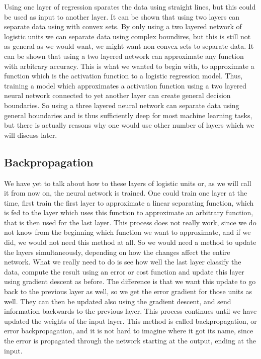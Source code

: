 Using one layer of regression sparates the data using straight lines, but this could be used as input to another layer. It can be shown that using two layers can separate data using with convex sets. By only using a two layered network of logistic units we can separate data using complex boundires, but this is still not as general as we would want, we might want non convex sets to separate data. It can be shown \cite{bishop_neural} that using a two layered network can approximate any function with arbitrary accuracy. This is what we wanted to begin with, to approximate a function which is the activation function to a logistic regression model. Thus, training a model which approximates a activation function using a two layered neural network connected to yet another layer can create general decision boundaries. So using a three layered neural network can separate data using general boundaries and is thus sufficiently deep for most machine learning tasks, but there is actually reasons why one would use other number of layers which we will discuss later.

\subsection{Backpropagation}

We have yet to talk about how to these layers of logistic units or, as we will call it from now on, the neural network is trained. One could train one layer at the time, first train the first layer to approximate a linear separating function, which is fed to the layer which uses this function to approximate an arbitrary function, that is then used for the last layer. This process does not really work, since we do not know from the beginning which function we want to approximate, and if we did, we would not need this method at all. So we would need a method to update the layers simultaneously, depending on how the changes affect the entire network. What we really need to do is see how well the last layer classify the data, compute the result using an error or cost function and update this layer using gradient descent as before. The difference is that we want this update to go back to the previous layer as well, so we get the error gradient for those units as well. They can then be updated also using the gradient descent, and send information backwards to the previous layer. This process continues until we have updated the weights of the input layer. This method is called backpropagation, or error backpropagation, and it is not hard to imagine where it got its name, since the error is propagated through the network starting at the output, ending at the input.

